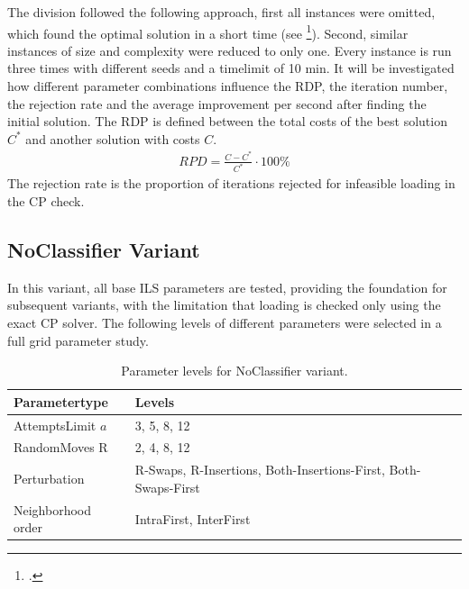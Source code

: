 The division followed the following approach, first all instances were omitted, which found
the optimal solution in a short time (see \cite{tamke_branch-and-cut_2024}\footcite[cf.][p.26]{tamke_branch-and-cut_2024}). Second, similar instances of size and complexity were reduced to only one.
Every instance is run three times with different seeds and a timelimit of 10 min. It will be investigated
how different parameter combinations influence the \gls{RDP}, the iteration number, the rejection rate and
the average improvement per second after finding the initial solution. The \gls{RDP} is defined between the
total costs of the best solution $C^*$ and another solution with costs $C$.
\begin{align}
    RPD = \frac{C - C^*}{C^*} \cdot 100\%
\end{align}
The rejection rate is the proportion of iterations rejected for infeasible loading in the CP check.

\subsection{NoClassifier Variant}
\label{subsec_parameterStuy_noclassifier}
In this variant, all base \gls{ILS} parameters are tested, providing the foundation for subsequent variants,
with the limitation that loading is checked only using the exact \gls{CP} solver. The following levels of
different parameters were selected in a full grid parameter study.

\begin{table}[ht]
    \centering
    \setlength{\tabcolsep}{2em}
    \def\arraystretch{1.1}
    \begin{tabular}{@{}P{4cm}P{8cm}@{}}
        \toprule
        Parametertype      & Levels                                                         \\
        \midrule
        AttemptsLimit $a$  & 3, 5, 8, 12                                                    \\
        RandomMoves R      & 2, 4, 8, 12                                                    \\
        Perturbation       & R-Swaps, R-Insertions, Both-Insertions-First, Both-Swaps-First \\
        Neighborhood order & IntraFirst, InterFirst                                         \\
        \bottomrule
    \end{tabular}
    \caption{Parameter levels for NoClassifier variant.}
    \label{tab:parameters_noclassifier}
\end{table}

